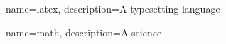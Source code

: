 

{
    name=latex,
    description={A typesetting language}
}

{
    name=math,
    description={A science}
}

